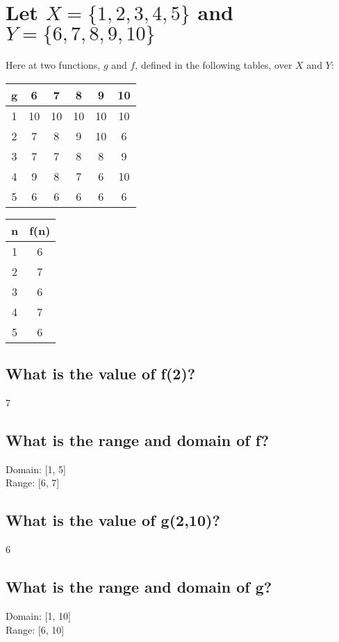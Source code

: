 \documentclass{article}
\begin{document}
\section{Let $X = \{1,2,3,4,5\}$ and $Y = \{6,7,8,9,10\}$}
Here at two functions, $g$ and $f$, defined in the following tables, over $X$ and $Y$:
\begin{center}
	\begin{tabular}{ |c|c|c|c|c|c| }
		\hline
		g & 6  & 7  & 8  & 9  & 10 \\
		\hline
		1 & 10 & 10 & 10 & 10 & 10 \\
		2 & 7  & 8  & 9  & 10 & 6  \\
		3 & 7  & 7  & 8  & 8  & 9  \\
		4 & 9  & 8  & 7  & 6  & 10 \\
		5 & 6  & 6  & 6  & 6  & 6  \\
		\hline
	\end{tabular}

	\begin{tabular}{ |c|c| }
		\hline
		n & f(n) \\
		\hline
		1 & 6    \\
		2 & 7    \\
		3 & 6    \\
		4 & 7    \\
		5 & 6    \\
		\hline
	\end{tabular}
\end{center}
\subsection{What is the value of f(2)?}
\begin{center}
	7
\end{center}
\subsection{What is the range and domain of f?}
\begin{center}
	Domain: [1, 5] \\
	Range: [6, 7]
\end{center}
\subsection{What is the value of g(2,10)?}
\begin{center}
	6
\end{center}
\subsection{What is the range and domain of g?}
\begin{center}
	Domain: [1, 10] \\
	Range: [6, 10]
\end{center}
\end{document}

